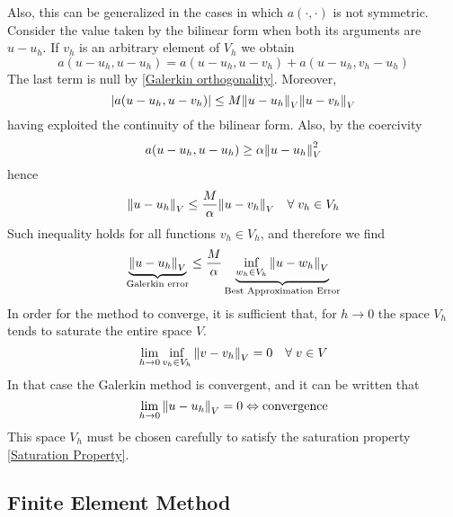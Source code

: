 Also, this can be generalized in the cases in which \(a(\cdot, \cdot)\) is not symmetric. Consider the value taken by the bilinear form when both its arguments are \(u-u_h\). If \(v_h\) is an arbitrary element of \(V_h\) we obtain 
\[
    a(u-u_h, u-u_h) = a(u-u_h, u-v_h) + a(u-u_h, v_h-u_h)
\]
The last term is null by \eqref{Galerkin orthogonality}. Moreover, 
\[
    \abs{a(u-u_h, u-v_h)} \leq M \norm{u-u_h}_V\norm{u-v_h}_V
\]
having exploited the continuity of the bilinear form. Also, by the coercivity 
\[
    a(u-u_h, u-u_h) \geq \alpha \norm{u-u_h}^2_V
\]
hence 
\[
    \norm{u-u_h}_V \leq \frac{M}{\alpha} \norm{u-v_h}_V \quad \forall \; v_h \in V_h
\]
Such inequality holds for all functions \(v_h \in V_h\), and therefore we find 
\begin{equation}
   \underbrace{ \norm{u-u_h}_V}_{\text{Galerkin error}} \leq \frac{M}{\alpha} \underbrace{\inf_{w_h \in V_h} \norm{u - w_h}_V}_{\text{Best Approximation Error}} \label{Ceà Lemma}
\end{equation}
In order for the method to converge, it is sufficient that, for \(h \to 0\) the space \(V_h\) tends to saturate the entire space \(V\). 
\begin{equation}
    \lim_{h \to 0} \inf_{v_h \in V_h} \norm{v-v_h}_V= 0 \quad \forall \; v \in V \label{Saturation Property}
\end{equation}
In that case the Galerkin method is convergent, and it can be written that
\[
    \lim_{h\to 0} \norm{u-u_h}_V = 0 \Leftrightarrow \text{convergence}
\]
This space \(V_h\) must be chosen carefully to satisfy the saturation property \eqref{Saturation Property}.
\subsection{Finite Element Method}
